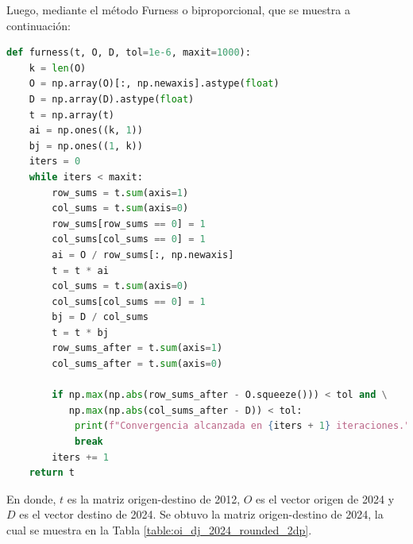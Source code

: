 \documentclass[letterpaper,12pt]{article}
\begin{document}
    
Luego, mediante el método Furness o biproporcional, que se muestra a continuación:

\begin{lstlisting}[language=Python, label= {lst:furness}]
    def furness(t, O, D, tol=1e-6, maxit=1000):  
    k = len(O)
    O = np.array(O)[:, np.newaxis].astype(float)
    D = np.array(D).astype(float)
    t = np.array(t)
    ai = np.ones((k, 1))
    bj = np.ones((1, k))
    iters = 0
    while iters < maxit:
        row_sums = t.sum(axis=1)
        col_sums = t.sum(axis=0)
        row_sums[row_sums == 0] = 1
        col_sums[col_sums == 0] = 1
        ai = O / row_sums[:, np.newaxis]
        t = t * ai
        col_sums = t.sum(axis=0)
        col_sums[col_sums == 0] = 1
        bj = D / col_sums
        t = t * bj
        row_sums_after = t.sum(axis=1)
        col_sums_after = t.sum(axis=0)
        
        if np.max(np.abs(row_sums_after - O.squeeze())) < tol and \
           np.max(np.abs(col_sums_after - D)) < tol:
            print(f"Convergencia alcanzada en {iters + 1} iteraciones.")
            break
        iters += 1
    return t
\end{lstlisting}

En donde, $t$ es la matriz origen-destino de 2012, $O$ es el vector origen de 2024 y $D$ es el vector destino de 2024. Se obtuvo la matriz origen-destino de 2024, la cual se muestra en la Tabla \ref{table:oi_dj_2024_rounded_2dp}.

\newpage
\end{document}
